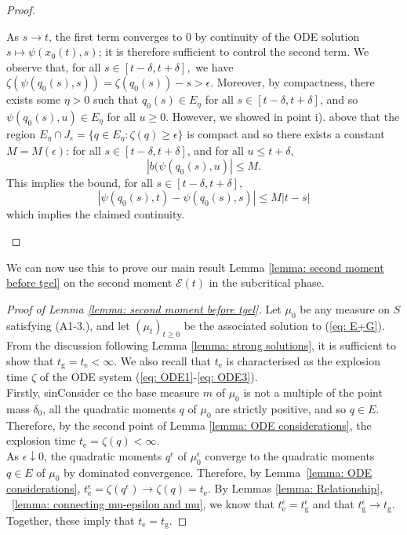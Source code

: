 \documentclass[11pt, notitlepage]{article}
\begin{document}
\begin{proof}
\begin{enumerate}[label=\roman{*}).]
\begin{equation}
\end{equation} As $s\rightarrow t$, the first term converges to $0$ by continuity of the ODE solution $s\mapsto \psi(x_0(t),s)$; it is therefore sufficient to control the second term. We observe that, for all $s\in[t-\delta, t+\delta],$ we have $\zeta(\psi(q_0(s),s))=\zeta(q_0(s))-s>\epsilon$. Moreover, by compactness, there exists some $\eta>0$ such that $q_0(s) \in E_\eta$ for all $s\in [t-\delta, t+\delta]$, and so $\psi(q_0(s),u)\in E_\eta$ for all $u\ge 0.$ However, we showed in point i). above that the region $E_\eta \cap J_\epsilon=\{q \in E_\eta: \zeta(q)\geq\epsilon\}$ is compact  and so there exists a constant $M=M(\epsilon)$: for all $s\in[t-\delta, t+\delta]$, and for all $u \le t+\delta$, \begin{equation} |b(\psi(q_0(s), u)| \le M. \end{equation}
This implies the bound, for all $s\in[t-\delta,t+\delta]$, \begin{equation} |\psi(q_0(s), t)-\psi(q_0(s), s)| \le M|t-s|\end{equation} which implies the claimed continuity.
\end{enumerate}  \end{proof}



We can now use this to prove our main result Lemma \ref{lemma: second moment before tgel} on the second moment $\mathcal{E}(t)$ in the subcritical phase.





\begin{proof}[Proof of Lemma \ref{lemma: second moment before tgel}]
Let $\mu_0$ be any measure on $S$ satisfying ({A1}-{3}.), and let $(\mu_t)_{t\ge 0}$ be the associated solution to (\ref{eq: E+G}). From the discussion following Lemma \ref{lemma: strong solutions}, it is sufficient to show that $t_\mathrm{g}=t_\mathrm{e}<\infty$. We also recall that $t_\mathrm{e}$ is characterised as the explosion time $\zeta$ of the ODE system (\ref{eq: ODE1}-\ref{eq: ODE3}). \medskip \\ Firstly, sinConsider ce the base measure $m$ of $\mu_0$ is not a multiple of the point mass $\delta_0$, all the quadratic moments $q$ of $\mu_0$ are strictly positive, and so $q \in E$. Therefore, by the second point of Lemma \ref{lemma: ODE considerations}, the explosion time $t_\mathrm{e}=\zeta(q)<\infty.$\medskip \\ 
As $\epsilon \downarrow 0$, the quadratic moments $q^\epsilon$ of $\mu^\epsilon_0$ converge to the quadratic moments $q\in E$ of $\mu_0$ by dominated convergence.  Therefore, by Lemma~\ref{lemma: ODE considerations},  $t^\epsilon_\mathrm{e}=\zeta(q^\epsilon)\rightarrow \zeta(q)= t_\mathrm{e}$.
By Lemmas \ref{lemma: Relationship}, ~\ref{lemma: connecting mu-epsilon and mu}, we know that $t_\mathrm{e}^\epsilon=t_\mathrm{g}^\epsilon$ and that $t_\mathrm{g}^\epsilon \rightarrow t_\mathrm{g}$. Together, these imply that $t_\mathrm{e} = t_\mathrm{g}$.

\end{proof} 
\end{document}
